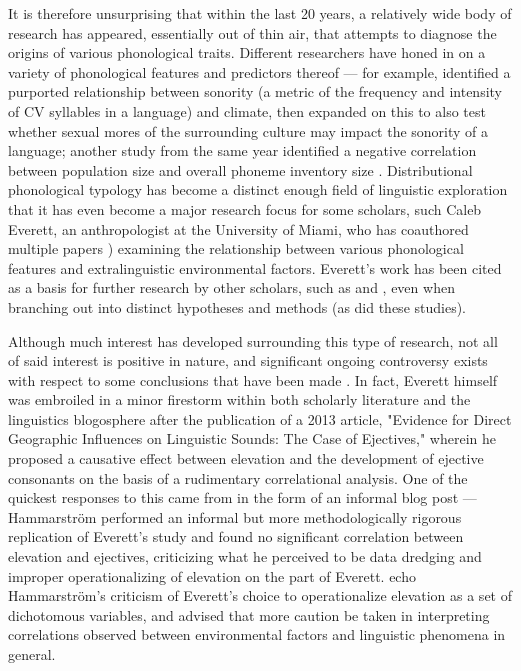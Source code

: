 \documentclass{article}
\begin{document}
It is therefore unsurprising that within the last 20 years, a relatively wide body of research has appeared, essentially out of thin air, that attempts to diagnose the origins of various phonological traits. Different researchers have honed in on a variety of phonological features and predictors thereof — for example, \textcite{fought2004} identified a purported relationship between sonority (a metric of the frequency and intensity of CV syllables in a language) and climate, then \textcite{ember2007} expanded on this to also test whether sexual mores of the surrounding culture may impact the sonority of a language; another study from the same year identified a negative correlation between population size and overall phoneme inventory size \parencite{hay2007}. Distributional phonological typology has become a distinct enough field of linguistic exploration that it has even become a major research focus for some scholars, such Caleb Everett, an anthropologist at the University of Miami, who has coauthored multiple papers \parencite{everett2013,everett2015,everett2016}) examining the relationship between various phonological features and extralinguistic environmental factors. Everett's work has been cited as a basis for further research by other scholars, such as \textcite{bentz2018} and \textcite{noelle2020}, even when branching out into distinct hypotheses and methods (as did these studies).

Although much interest has developed surrounding this type of research, not all of said interest is positive in nature, and significant ongoing controversy exists with respect to some conclusions that have been made \parencite{ladd2015}. In fact, Everett himself was embroiled in a minor firestorm within both scholarly literature and the linguistics blogosphere after the publication of a 2013 article, "Evidence for Direct Geographic Influences on Linguistic Sounds: The Case of Ejectives," wherein he proposed a causative effect between elevation and the development of ejective consonants on the basis of a rudimentary correlational analysis. One of the quickest responses to this came from \cite{hammarstroem2013} in the form of an informal blog post — Hammarström performed an informal but more methodologically rigorous replication of Everett's study and found no significant correlation between elevation and ejectives, criticizing what he perceived to be data dredging and improper operationalizing of elevation on the part of Everett. \textcite{haynie2014,dediu2017} echo Hammarström's criticism of Everett's choice to operationalize elevation as a set of dichotomous variables, and \textcite{haynie2014} advised that more caution be taken in interpreting correlations observed between environmental factors and linguistic phenomena in general.
\end{document}
